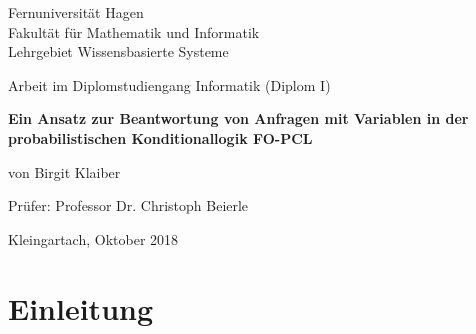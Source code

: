 \documentclass[a4paper, 11pt]{book}
\begin{document}
\begin{titlepage}
\thispagestyle{empty}
\begin{center}
\Large{Fernuniversität Hagen}\\
\Large{Fakultät für Mathematik und Informatik}\\
\Large{Lehrgebiet Wissensbasierte Systeme}\\[1.5cm]
\end{center}


\begin{center}
{Arbeit im Diplomstudiengang Informatik (Diplom I)}\\[2.0cm]
\end{center}

\begin{center}


\LARGE \textbf{Ein Ansatz zur Beantwortung von Anfragen mit Variablen in der probabilistischen Konditionallogik FO-PCL}\\[3.5cm]
\end{center}


\begin{center}
\large{von Birgit Klaiber}\\[3.5cm]
\end{center}

\begin{center}
\large{Prüfer: Professor Dr. Christoph Beierle }\\[1.0cm]
\end{center}

\begin{center}

	
\large{Kleingartach, Oktober 2018}
\end{center}

\end{titlepage}






\begingroup



\setcounter{tocdepth}{1}

\tableofcontents
\clearpage
\endgroup
{}
\pagestyle{plain}
\setcounter{page}{1}
\pagestyle{headings}


\setlength{\parskip}{5pt}




\chapter{Einleitung}
\end{document}
